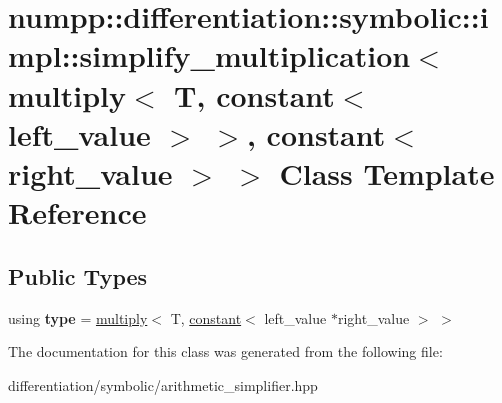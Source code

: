 \hypertarget{classnumpp_1_1differentiation_1_1symbolic_1_1impl_1_1simplify__multiplication_3_01multiply_3_01Te3834a073b1fa2b6ff55d54d5efcdc27}{}\section{numpp\+:\+:differentiation\+:\+:symbolic\+:\+:impl\+:\+:simplify\+\_\+multiplication$<$ multiply$<$ T, constant$<$ left\+\_\+value $>$ $>$, constant$<$ right\+\_\+value $>$ $>$ Class Template Reference}
\label{classnumpp_1_1differentiation_1_1symbolic_1_1impl_1_1simplify__multiplication_3_01multiply_3_01Te3834a073b1fa2b6ff55d54d5efcdc27}
\subsection*{Public Types}
\begin{DoxyCompactItemize}
\item 
\mbox{\label{classnumpp_1_1differentiation_1_1symbolic_1_1impl_1_1simplify__multiplication_3_01multiply_3_01Te3834a073b1fa2b6ff55d54d5efcdc27_a4b65fa2452402593a12851f0d6158a96}} 
using {\bfseries type} = \hyperlink{classnumpp_1_1differentiation_1_1symbolic_1_1multiply}{multiply}$<$ T, \hyperlink{classnumpp_1_1differentiation_1_1symbolic_1_1constant}{constant}$<$ left\+\_\+value $\ast$right\+\_\+value $>$ $>$
\end{DoxyCompactItemize}


The documentation for this class was generated from the following file\+:\begin{DoxyCompactItemize}
\item 
differentiation/symbolic/arithmetic\+\_\+simplifier.\+hpp\end{DoxyCompactItemize}

